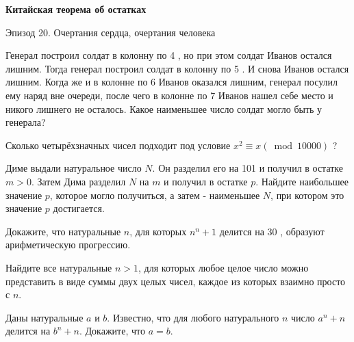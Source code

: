 \centerline{\bf \Huge Китайская теорема об остатках}


\begin{flushright}
        \scriptsize{Эпизод 20. Очертания сердца, очертания человека }
\end{flushright}


Генерал построил солдат в колонну по 4 , но при этом солдат Иванов остался лишним. Тогда генерал построил солдат в колонну по 5 . И снова Иванов остался лишним. Когда же и в колонне по 6 Иванов оказался лишним, генерал посулил ему наряд вне очереди, после чего в колонне по 7 Иванов нашел себе место и никого лишнего не осталось. Какое наименьшее число солдат могло быть у генерала?

Сколько четырёхзначных чисел подходит под условие $x^2 \equiv x(\bmod 10000)$ ?

Диме выдали натуральное число $N$. Он разделил его на 101 и получил в остатке $m>0$. Затем Дима разделил $N$ на $m$ и получил в остатке $p$. Найдите наибольшее значение $p$, которое могло получиться, а затем - наименьшее $N$, при котором это значение $p$ достигается.

Докажите, что натуральные $n$, для которых $n^n+1$ делится на 30 , образуют арифметическую прогрессию.

Найдите все натуральные $n>1$, для которых любое целое число можно представить в виде суммы двух целых чисел, каждое из которых взаимно просто с $n$.

Даны натуральные $a$ и $b$. Известно, что для любого натурального $n$ число $a^n+n$ делится на $b^n+n$. Докажите, что $a=b$.
